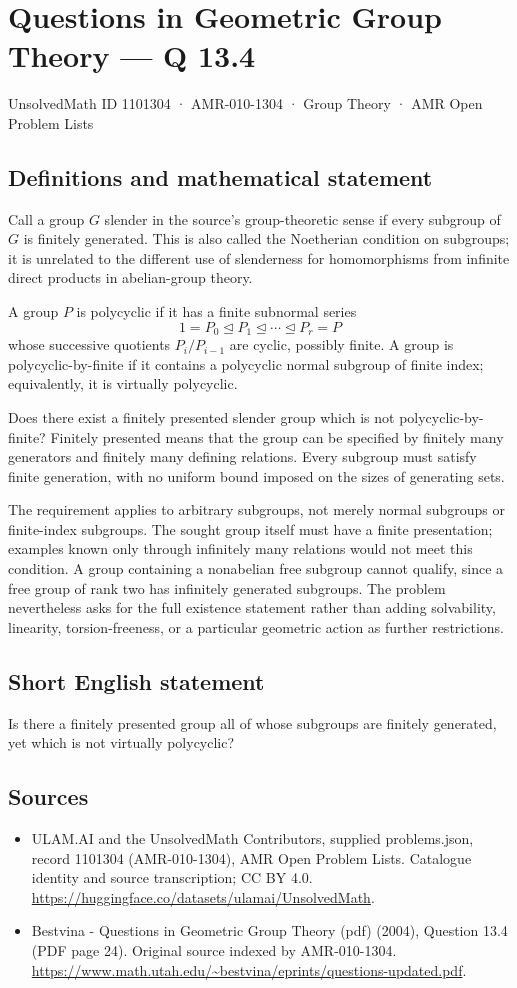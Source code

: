 \documentclass[11pt,a4paper]{article}
\begin{document}
\section*{Questions in Geometric Group Theory — Q 13.4}\label{1101304}
{\small UnsolvedMath ID 1101304 · AMR-010-1304 · Group Theory · AMR Open Problem Lists}
\subsection{Definitions and mathematical statement}
Call a group $G$ slender in the source's group-theoretic sense if every subgroup of $G$ is finitely generated. This is also called the Noetherian condition on subgroups; it is unrelated to the different use of slenderness for homomorphisms from infinite direct products in abelian-group theory.

A group $P$ is polycyclic if it has a finite subnormal series
\[
 1=P_0\trianglelefteq P_1\trianglelefteq\cdots
        \trianglelefteq P_r=P
\]
whose successive quotients $P_i/P_{i-1}$ are cyclic, possibly finite. A group is polycyclic-by-finite if it contains a polycyclic normal subgroup of finite index; equivalently, it is virtually polycyclic.

Does there exist a finitely presented slender group which is not polycyclic-by-finite? Finitely presented means that the group can be specified by finitely many generators and finitely many defining relations. Every subgroup must satisfy finite generation, with no uniform bound imposed on the sizes of generating sets.

The requirement applies to arbitrary subgroups, not merely normal subgroups or finite-index subgroups. The sought group itself must have a finite presentation; examples known only through infinitely many relations would not meet this condition. A group containing a nonabelian free subgroup cannot qualify, since a free group of rank two has infinitely generated subgroups. The problem nevertheless asks for the full existence statement rather than adding solvability, linearity, torsion-freeness, or a particular geometric action as further restrictions.
\subsection{Short English statement}
Is there a finitely presented group all of whose subgroups are finitely generated, yet which is not virtually polycyclic?
\subsection{Sources}
\begin{itemize}
\item[S1] ULAM.AI and the UnsolvedMath Contributors, supplied problems.json, record 1101304 (AMR-010-1304), AMR Open Problem Lists. Catalogue identity and source transcription; CC BY 4.0.
\url{https://huggingface.co/datasets/ulamai/UnsolvedMath}.
\item[S2] Bestvina - Questions in Geometric Group Theory (pdf) (2004), Question 13.4 (PDF page 24). Original source indexed by AMR-010-1304.
\url{https://www.math.utah.edu/~bestvina/eprints/questions-updated.pdf}.
\end{itemize}
\end{document}
